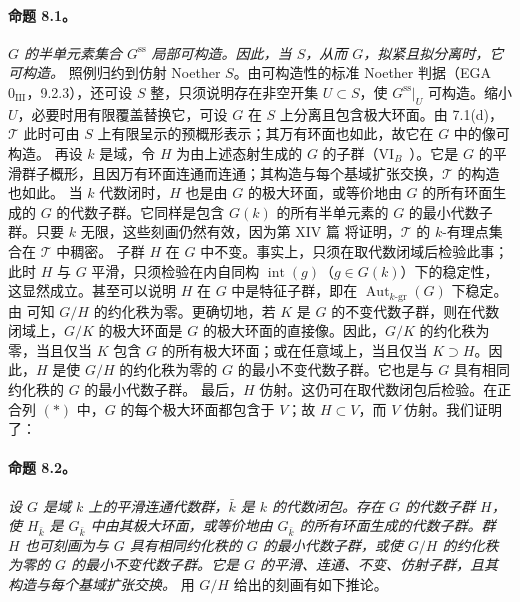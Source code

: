 \paragraph{\textbf{命题 8.1。}}
\emph{\(G\) 的半单元素集合 \(G^{\mathrm{ss}}\) 局部可构造。因此，当 \(S\)，从而 \(G\)，拟紧且拟分离时，它可构造。}
照例归约到仿射 Noether \(S\)。由可构造性的标准 Noether 判据（EGA \(0_{\mathrm{III}}\)，9.2.3），还可设 \(S\) 整，只须说明存在非空开集 \(U\subset S\)，使 \(G^{\mathrm{ss}}|_U\) 可构造。缩小 \(U\)，必要时用有限覆盖替换它，可设 \(G\) 在 \(S\) 上分离且包含极大环面。由 7.1(d)，\(\mathcal T\) 此时可由 \(S\) 上有限呈示的预概形表示；其万有环面也如此，故它在 \(G\) 中的像可构造。
再设 \(k\) 是域，令 \(H\) 为由上述态射生成的 \(G\) 的子群（VI\(_B\)~）。它是 \(G\) 的平滑群子概形，且因万有环面连通而连通；其构造与每个基域扩张交换，\(\mathcal T\) 的构造也如此。
当 \(k\) 代数闭时，\(H\) 也是由 \(G\) 的极大环面，或等价地由 \(G\) 的所有环面生成的 \(G\) 的代数子群。它同样是包含 \(G(k)\) 的所有半单元素的 \(G\) 的最小代数子群。只要 \(k\) 无限，这些刻画仍然有效，因为第 XIV 篇 将证明，\(\mathcal T\) 的 \(k\)-有理点集合在 \(\mathcal T\) 中稠密。
子群 \(H\) 在 \(G\) 中不变。事实上，只须在取代数闭域后检验此事；此时 \(H\) 与 \(G\) 平滑，只须检验在内自同构 \(\operatorname{int}(g)\)（\(g\in G(k)\)）下的稳定性，这显然成立。甚至可以说明 \(H\) 在 \(G\) 中是特征子群，即在 \(\operatorname{Aut}_{k\text{-}\mathrm{gr}}(G)\) 下稳定。
由  可知 \(G/H\) 的约化秩为零。更确切地，若 \(K\) 是 \(G\) 的不变代数子群，则在代数闭域上，\(G/K\) 的极大环面是 \(G\) 的极大环面的直接像。因此，\(G/K\) 的约化秩为零，当且仅当 \(K\) 包含 \(G\) 的所有极大环面；或在任意域上，当且仅当 \(K\supset H\)。因此，\(H\) 是使 \(G/H\) 的约化秩为零的 \(G\) 的最小不变代数子群。它也是与 \(G\) 具有相同约化秩的 \(G\) 的最小代数子群。
最后，\(H\) 仿射。这仍可在取代数闭包后检验。在正合列 \((*)\) 中，\(G\) 的每个极大环面都包含于 \(V\)；故 \(H\subset V\)，而 \(V\) 仿射。我们证明了：
\paragraph{\textbf{命题 8.2。}}
\emph{设 \(G\) 是域 \(k\) 上的平滑连通代数群，\(\bar k\) 是 \(k\) 的代数闭包。存在 \(G\) 的代数子群 \(H\)，使 \(H_{\bar k}\) 是 \(G_{\bar k}\) 中由其极大环面，或等价地由 \(G_{\bar k}\) 的所有环面生成的代数子群。群 \(H\) 也可刻画为与 \(G\) 具有相同约化秩的 \(G\) 的最小代数子群，或使 \(G/H\) 的约化秩为零的 \(G\) 的最小不变代数子群。它是 \(G\) 的平滑、连通、不变、仿射子群，且其构造与每个基域扩张交换。}
用 \(G/H\) 给出的刻画有如下推论。
